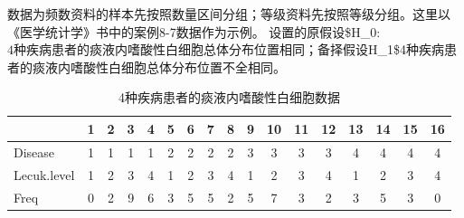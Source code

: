 \documentclass[
]{article}
\begin{document}
数据为频数资料的样本先按照数量区间分组；等级资料先按照等级分组。这里以《医学统计学》书中的案例8-7数据作为示例。
设置的原假设\$H\_0:\(4种疾病患者的痰液内嗜酸性白细胞总体分布位置相同；备择假设\)H\_1\$4种疾病患者的痰液内嗜酸性白细胞总体分布位置不全相同。

\begin{table}

\caption{\label{tab:ranktab3}4种疾病患者的痰液内嗜酸性白细胞数据}
\centering
\begin{tabular}[t]{lcccccccccccccccc}
\toprule
  & 1 & 2 & 3 & 4 & 5 & 6 & 7 & 8 & 9 & 10 & 11 & 12 & 13 & 14 & 15 & 16\\
\midrule
Disease & 1 & 1 & 1 & 1 & 2 & 2 & 2 & 2 & 3 & 3 & 3 & 3 & 4 & 4 & 4 & 4\\
Lecuk.level & 1 & 2 & 3 & 4 & 1 & 2 & 3 & 4 & 1 & 2 & 3 & 4 & 1 & 2 & 3 & 4\\
Freq & 0 & 2 & 9 & 6 & 3 & 5 & 5 & 2 & 5 & 7 & 3 & 2 & 3 & 5 & 3 & 0\\
\bottomrule
\end{tabular}
\end{table}
\end{document}
